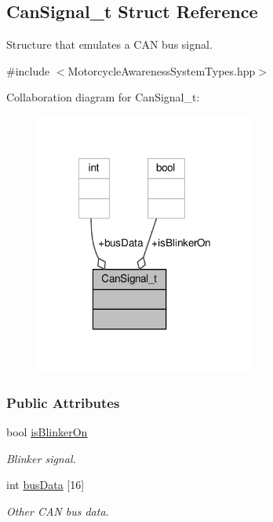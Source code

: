 \hypertarget{structCanSignal__t}{\subsection{Can\-Signal\-\_\-t Struct Reference}
\label{structCanSignal__t}
}


Structure that emulates a C\-A\-N bus signal.  




{\ttfamily \#include $<$Motorcycle\-Awareness\-System\-Types.\-hpp$>$}



Collaboration diagram for Can\-Signal\-\_\-t\-:\nopagebreak
\begin{figure}[H]
\begin{center}
\leavevmode
\includegraphics[width=206pt]{structCanSignal__t__coll__graph}
\end{center}
\end{figure}
\subsubsection*{Public Attributes}
\begin{DoxyCompactItemize}
\item 
bool \hyperlink{structCanSignal__t_a209edc6387534529f57c2362ec8f2586}{is\-Blinker\-On}
\begin{DoxyCompactList}\small\item\em Blinker signal. \end{DoxyCompactList}\item 
int \hyperlink{structCanSignal__t_a460bece1b65aa03b07f986c71f818456}{bus\-Data} \mbox{[}16\mbox{]}
\begin{DoxyCompactList}\small\item\em Other C\-A\-N bus data. \end{DoxyCompactList}\end{DoxyCompactItemize}


